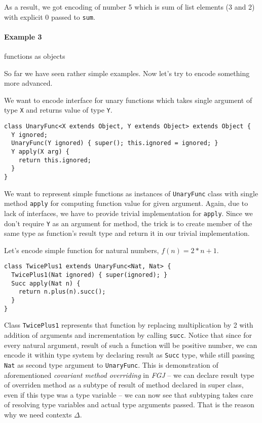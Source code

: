 \documentclass{article}[12pt]
\begin{document}
As a result, we got encoding of number 5 which is sum of list
elements (3 and 2) with explicit 0 passed to \texttt{sum}.

\paragraph{Example 3} functions as objects

So far we have seen rather simple examples. Now let's try to
encode something more advanced.

We want to encode interface for unary functions which takes
single argument of type \texttt{X} and returns value
of type \texttt{Y}.

\begin{verbatim}
class UnaryFunc<X extends Object, Y extends Object> extends Object {
  Y ignored;
  UnaryFunc(Y ignored) { super(); this.ignored = ignored; }
  Y apply(X arg) {
    return this.ignored;
  }
}
\end{verbatim}

We want to represent simple functions as instances of
\texttt{UnaryFunc} class with single method \texttt{apply} for
computing function value for given argument. Again, due to lack
of interfaces, we have to provide trivial implementation for
\texttt{apply}. Since we don't require \texttt{Y} as an argument
for method, the trick is to create member of the same type as
function's result type and return it in our trivial implementation.

Let's encode simple function for natural numbers, $f(n) = 2 * n + 1$.

\begin{verbatim}
class TwicePlus1 extends UnaryFunc<Nat, Nat> {
  TwicePlus1(Nat ignored) { super(ignored); }
  Succ apply(Nat n) {
    return n.plus(n).succ();
  }
}
\end{verbatim}

Class \texttt{TwicePlus1} represents that function by replacing
multiplication by 2 with addition of arguments and incrementation
by calling \texttt{succ}. Notice that since for every natural argument,
result of such a function will be positive number, we can encode it
within type system by declaring result as \texttt{Succ} type, while
still passing \texttt{Nat} as second type argument to
\texttt{UnaryFunc}. This is demonstration of aforementioned
\emph{covariant method overriding} in \emph{FGJ} -- we can declare
result type of overriden method as a subtype of result of method
declared in super class, even if this type was a type variable --
we can now see that subtyping takes care of resolving type variables
and actual type arguments passed. That is the reason why we need
contexts $\Delta$.
\end{document}
